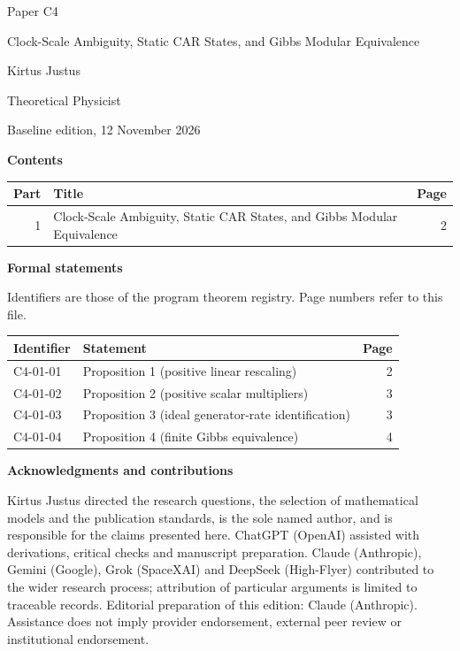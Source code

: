 \documentclass[11pt,a4paper]{article}
\begin{document}
\thispagestyle{empty}\pagestyle{empty}
{\small\sffamily \ProgramTitle\hfill Paper C4\par}
\vspace*{12mm}
{\LARGE\bfseries\raggedright{} Clock-Scale Ambiguity, Static CAR States, and Gibbs Modular Equivalence\par}
\vspace{9mm}
{\large Kirtus Justus\par}\vspace{1mm}Theoretical Physicist\par\AuthorLocation\par\vspace{2mm}Baseline edition, 12 November 2026\par\vspace{8mm}
\textbf{Contents}\par\vspace{1mm}
{\small\begin{longtable}{@{}r>{\raggedright\arraybackslash}p{}r@{}}
\toprule Part & Title & Page\\\midrule\endhead
1 & Clock-Scale Ambiguity, Static CAR States, and Gibbs Modular Equivalence & 2\\
\bottomrule\end{longtable}}
\vspace{2mm}\textbf{Formal statements}\par\vspace{1mm}
{\footnotesize Identifiers are those of the program theorem registry. Page numbers refer to this file.\par}
{\footnotesize\begin{longtable}{@{}l>{\raggedright\arraybackslash}p{}r@{}}
\toprule Identifier & Statement & Page\\\midrule\endhead
C4-01-01 & Proposition 1 (positive linear rescaling) & 2\\
C4-01-02 & Proposition 2 (positive scalar multipliers) & 3\\
C4-01-03 & Proposition 3 (ideal generator-rate identification) & 3\\
C4-01-04 & Proposition 4 (finite Gibbs equivalence) & 4\\
\bottomrule\end{longtable}}
\vspace{3mm}\textbf{Acknowledgments and contributions}\par
{\small Kirtus Justus directed the research questions, the selection of mathematical models and the publication standards, is the sole named author, and is responsible for the claims presented here. ChatGPT (OpenAI) assisted with derivations, critical checks and manuscript preparation. Claude (Anthropic), Gemini (Google), Grok (SpaceXAI) and DeepSeek (High-Flyer) contributed to the wider research process; attribution of particular arguments is limited to traceable records. Editorial preparation of this edition: Claude (Anthropic). Assistance does not imply provider endorsement, external peer review or institutional endorsement.\par}
\end{document}
